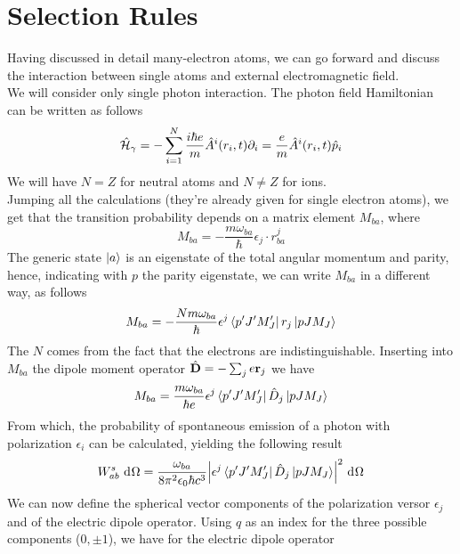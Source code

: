 \documentclass[../qm.tex]{subfiles}
\begin{document}
	\section{Selection Rules}
	Having discussed in detail many-electron atoms, we can go forward and discuss the interaction between single atoms and external electromagnetic field.\\
	We will consider only single photon interaction. The photon field Hamiltonian can be written as follows
	\begin{equation}
		\hat{\mathcal{H}}_{\gamma}=-\sum_{i=1}^N\frac{i\hbar e}{m}\hat{A}^i(r_i,t)\partial_i=\frac{e}{m}\hat{A}^i(r_i,t)\hat{p}_i
		\label{eq:photonhamiltonian}
	\end{equation}
	We will have $N=Z$ for neutral atoms and $N\ne Z$ for ions.\\
	Jumping all the calculations (they're already given for single electron atoms), we get that the transition probability depends on a matrix element $M_{ba}$, where
	\begin{equation}
		M_{ba}=-\frac{m\omega_{ba}}{\hbar}\epsilon_j\cdot r^j_{ba}
		\label{eq:transitionmatrixmanyelecem}
	\end{equation}
	The generic state $\ket{a}$ is an eigenstate of the total angular momentum and parity, hence, indicating with $p$ the parity eigenstate, we can write $M_{ba}$ in a different way, as follows
	\begin{equation}
		M_{ba}=-\frac{Nm\omega_{ba}}{\hbar}\epsilon^j\bra{p'J'M_J'}r_j\ket{pJM_J}
		\label{eq:mbawithnewbasis}
	\end{equation}
	The $N$ comes from the fact that the electrons are indistinguishable. Inserting into $M_{ba}$ the dipole moment operator $\hat{\mathbf{D}}=-\sum_je\mathbf{r}_j$ we have
	\begin{equation}
		M_{ba}=\frac{m\omega_{ba}}{\hbar e}\epsilon^j\bra{p'J'M_J'}\hat{D}_j\ket{pJM_J}
		\label{eq:dipolemomentinsideM}
	\end{equation}
	From which, the probability of spontaneous emission of a photon with polarization $\epsilon_i$ can be calculated, yielding the following result
	\begin{equation}
		W^s_{ab}\ \mathrm{d}^{}\Omega=\frac{\omega_{ba}}{8\pi^2\epsilon_0\hbar c^3}\abs{\epsilon^j\bra{p'J'M_J'}\hat{D}_j\ket{pJM_J}}^2\ \mathrm{d}^{}\Omega
		\label{eq:seprobmanyelec}
	\end{equation}
	We can now define the spherical vector components of the polarization versor $\epsilon_j$ and of the electric dipole operator. Using $q$ as an index for the three possible components ($0,\pm1$), we have for the electric dipole operator
\end{document}
